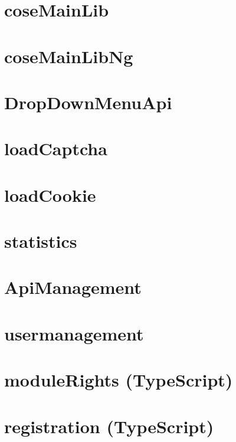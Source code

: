 \section{coseMainLib}

\newpage
\section{coseMainLibNg}

\newpage
\section{DropDownMenuApi}

\newpage
\section{loadCaptcha}

\newpage
\section{loadCookie}

\newpage
\section{statistics}

\newpage
\section{ApiManagement}

\newpage
\section{usermanagement}

\newpage
\section{moduleRights (TypeScript)}

\newpage
\section{registration (TypeScript)}
